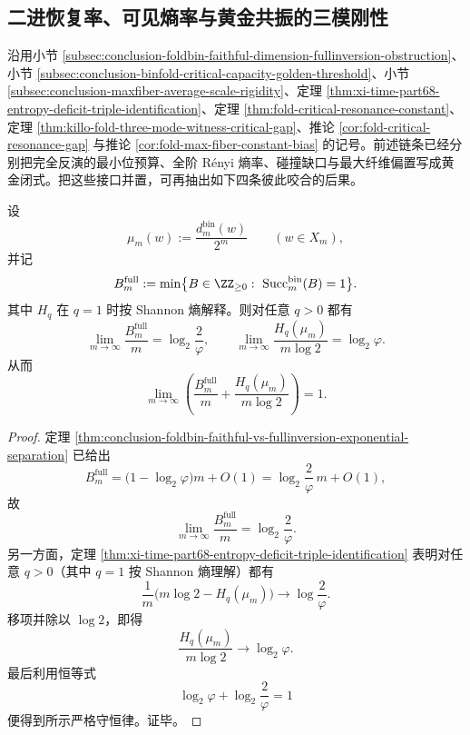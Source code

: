 \subsection{二进恢复率、可见熵率与黄金共振的三模刚性}\label{subsec:conclusion-binfold-recovery-entropy-golden-resonance}
沿用小节 \ref{subsec:conclusion-foldbin-faithful-dimension-fullinversion-obstruction}、小节 \ref{subsec:conclusion-binfold-critical-capacity-golden-threshold}、小节 \ref{subsec:conclusion-maxfiber-average-scale-rigidity}、定理 \ref{thm:xi-time-part68-entropy-deficit-triple-identification}、定理 \ref{thm:fold-critical-resonance-constant}、定理 \ref{thm:killo-fold-three-mode-witness-critical-gap}、推论 \ref{cor:fold-critical-resonance-gap} 与推论 \ref{cor:fold-max-fiber-constant-bias} 的记号。前述链条已经分别把完全反演的最小位预算、全阶 Rényi 熵率、碰撞缺口与最大纤维偏置写成黄金闭式。把这些接口并置，可再抽出如下四条彼此咬合的后果。

\begin{theorem}[二进恢复率与可见熵率的精确一比特分解]\label{thm:conclusion-binfold-fullrecovery-visible-entropy-onebit-splitting}
设
\[
\mu_m(w):=\frac{d_m^{\mathrm{bin}}(w)}{2^m}
\qquad (w\in X_m),
\]
并记
\[
B_m^{\mathrm{full}}
:=
\min\bigl\{B\in\ZZ_{\ge 0}:\ \mathrm{Succ}_m^{\mathrm{bin}}(B)=1\bigr\}.
\]
其中 \(H_q\) 在 \(q=1\) 时按 Shannon 熵解释。则对任意 \(q>0\) 都有
\[
\lim_{m\to\infty}\frac{B_m^{\mathrm{full}}}{m}
=
\log_2\frac{2}{\varphi},
\qquad
\lim_{m\to\infty}\frac{H_q(\mu_m)}{m\log 2}
=
\log_2\varphi.
\]
从而
\[
\lim_{m\to\infty}
\left(
\frac{B_m^{\mathrm{full}}}{m}
+
\frac{H_q(\mu_m)}{m\log 2}
\right)
=1.
\]
\end{theorem}
\begin{proof}
定理 \ref{thm:conclusion-foldbin-faithful-vs-fullinversion-exponential-separation} 已给出
\[
B_m^{\mathrm{full}}
=
\bigl(1-\log_2\varphi\bigr)m+O(1)
=
\log_2\frac{2}{\varphi}\,m+O(1),
\]
故
\[
\lim_{m\to\infty}\frac{B_m^{\mathrm{full}}}{m}
=
\log_2\frac{2}{\varphi}.
\]
另一方面，定理 \ref{thm:xi-time-part68-entropy-deficit-triple-identification} 表明对任意 \(q>0\)（其中 \(q=1\) 按 Shannon 熵理解）都有
\[
\frac{1}{m}\bigl(m\log 2-H_q(\mu_m)\bigr)\longrightarrow \log\frac{2}{\varphi}.
\]
移项并除以 \(\log 2\)，即得
\[
\frac{H_q(\mu_m)}{m\log 2}\longrightarrow \log_2\varphi.
\]
最后利用恒等式
\[
\log_2\varphi+\log_2\frac{2}{\varphi}=1
\]
便得到所示严格守恒律。证毕。
\end{proof}

